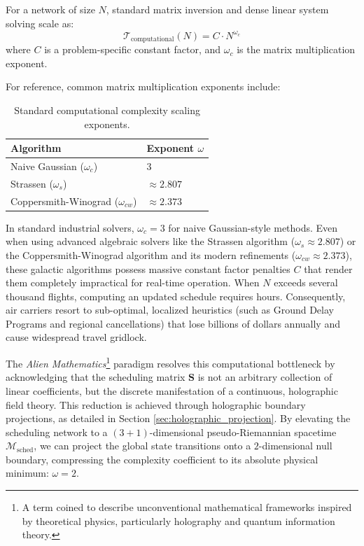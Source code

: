\documentclass[11pt,a4paper]{book}
\begin{document}
For a network of size $N$, standard matrix inversion and dense linear system solving scale as:
\begin{equation}
\label{eq:matrix_scaling_classical}
\mathcal{T}_{\text{computational}}(N) = C \cdot N^{\omega_c}
\end{equation}
where $C$ is a problem-specific constant factor, and $\omega_c$ is the matrix multiplication exponent.

For reference, common matrix multiplication exponents include:\\
\begin{table}[htbp]
\centering
\begin{tabular}{ll}
\hline
Algorithm & Exponent $\omega$ \\
\hline
Naive Gaussian ($\omega_c$) & 3 \\
Strassen ($\omega_s$) & $\approx 2.807$ \\
Coppersmith-Winograd ($\omega_{cw}$) & $\approx 2.373$ \\
\hline
\end{tabular}
\caption{Standard computational complexity scaling exponents.}
\label{tab:exponents}
\end{table}

In standard industrial solvers, $\omega_c = 3$ for naive Gaussian-style methods. Even when using advanced algebraic solvers like the Strassen algorithm ($\omega_s \approx 2.807$) or the Coppersmith-Winograd algorithm and its modern refinements ($\omega_{cw} \approx 2.373$), these galactic algorithms possess massive constant factor penalties $C$ that render them completely impractical for real-time operation. When $N$ exceeds several thousand flights, computing an updated schedule requires hours. Consequently, air carriers resort to sub-optimal, localized heuristics (such as Ground Delay Programs and regional cancellations) that lose billions of dollars annually and cause widespread travel gridlock.

The \textit{Alien Mathematics}\footnote{A term coined to describe unconventional mathematical frameworks inspired by theoretical physics, particularly holography and quantum information theory.} paradigm resolves this computational bottleneck by acknowledging that the scheduling matrix $\mathbf{S}$ is not an arbitrary collection of linear coefficients, but the discrete manifestation of a continuous, holographic field theory. This reduction is achieved through holographic boundary projections, as detailed in Section \ref{sec:holographic_projection}. By elevating the scheduling network to a $(3+1)$-dimensional pseudo-Riemannian spacetime $\mathcal{M}_{\text{sched}}$, we can project the global state transitions onto a $2$-dimensional null boundary, compressing the complexity coefficient to its absolute physical minimum: $\omega = 2$.
\end{document}
